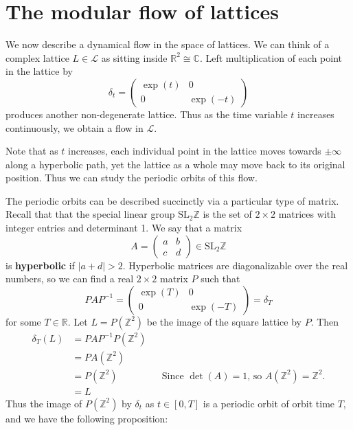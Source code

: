 \documentclass[12pt,twoside]{reedthesis}
\theoremstyle{definition}
\newcommand{\Z}{\mathbb{Z}}
\newcommand{\R}{\mathbb{R}}
\newcommand{\C}{\mathbb{C}}
\newcommand{\LS}{\mathcal{L}}
\newcommand{\SLZ}{\mathrm{SL}_2{\Z}}
\newcommand{\defnphrase}[1]{\textbf{#1}}
\begin{document}
\section{The modular flow of lattices}\label{subsec:lattice_flow}

We now describe a dynamical flow in the space of lattices.
We can think of a complex lattice $L \in \LS$ as sitting inside $\R^2 \cong \C$. Left multiplication of each point in the lattice by
\begin{equation}\label{eq:delta_t}
  \delta_t = \begin{pmatrix}
    \exp(t) & 0 \\
    0 & \exp(-t)
  \end{pmatrix}
\end{equation}
produces another non-degenerate lattice.
Thus as the time variable $t$ increases continuously, we obtain a flow in $\LS$.
  
Note that as $t$ increases, each individual point in the lattice moves towards $\pm \infty$ along a hyperbolic path, yet the lattice as a whole may move back to its original position.
Thus we can study the periodic orbits of this flow. 

The periodic orbits can be described succinctly via a particular type of matrix.
Recall that that the special linear group $\SLZ$ is the set of $2 \times 2$ matrices with integer entries and determinant 1.
We say that a matrix
\begin{equation*}
  A = \begin{pmatrix}
    a & b \\
    c & d
  \end{pmatrix} \in \SLZ
\end{equation*}
is \defnphrase{hyperbolic} if $|a + d| > 2$.
Hyperbolic matrices are diagonalizable over the real numbers, so we can find a real $2 \times 2$ matrix $P$ such that
\begin{equation*}
  PAP^{-1} = \begin{pmatrix}
    \exp(T) & 0 \\
    0 & \exp(-T)
  \end{pmatrix} = \delta_{T}
\end{equation*}
for some $T \in \R$. Let $L = P(\Z^2)$ be the image of the square lattice by $P$. Then
\begin{align*}
  \delta_{T}(L) &= PAP^{-1} P(\Z^2) \\
  &= PA(\Z^2) \\
  &= P(\Z^2) && \text{Since $\det(A) = 1$, so $A(\Z^2) = \Z^2$.} \\
  &= L
\end{align*}
Thus the image of $P(\Z^2)$ by $\delta_t$ as $t \in [0, T]$ is a periodic orbit of orbit time $T$, and we have the following proposition: 
\end{document}
